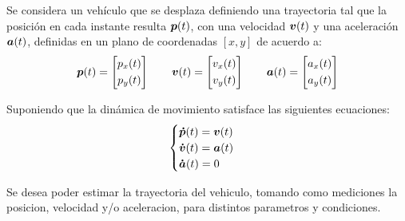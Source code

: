 
	Se considera un vehículo que se desplaza definiendo una trayectoria tal que la posición en cada instante resulta $\boldsymbol{p}(t)$, con una velocidad $\boldsymbol{v}(t)$ y una aceleración $\boldsymbol{a}(t)$, definidas en un plano de coordenadas $[x,y]$ de acuerdo a:
	\begin{equation*}
		\vect{p}(t) = \begin{bmatrix} p_x(t) \\[0.3em] p_y(t) \end{bmatrix} \qquad%
		\vect{v}(t) = \begin{bmatrix} v_x(t) \\[0.3em] v_y(t) \end{bmatrix} \qquad%
		\vect{a}(t) = \begin{bmatrix} a_x(t) \\[0.3em] a_y(t) \end{bmatrix}%
	\end{equation*}

	Suponiendo que la dinámica de movimiento satisface las siguientes ecuaciones:
	\begin{equation}
		\begin{cases}
			\boldsymbol{\dot{p}}(t) = \boldsymbol{v}(t)\\
			\boldsymbol{\dot{v}}(t) = \boldsymbol{a}(t)\\
			\boldsymbol{\dot{a}}(t) = 0
		\end{cases}
		\label{eq:dinamica_enun}
	\end{equation}

	Se desea poder estimar la trayectoria del vehiculo, tomando como mediciones la posicion, velocidad y/o aceleracion, para distintos parametros y condiciones.
